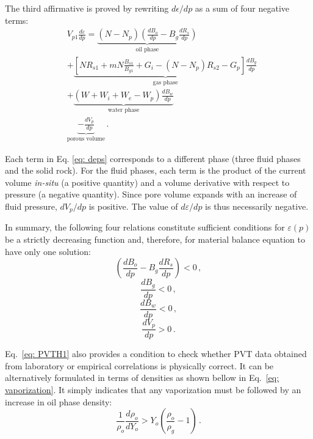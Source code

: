\documentclass[final,authoryear,5p,twocolumn,10pt]{elsarticle}
\begin{document}
The third affirmative is proved by rewriting $d\epsilon/dp$ as a sum of four negative terms:
\begin{equation}\label{eq: deps}
\begin{split}
&V_{p1}\frac{d\varepsilon}{dp}=\underbrace{\left(N-N_p\right) \left(\frac{dB_o}{dp} - B_g \frac{dR_s}{dp} \right)}_\text{oil phase}\\
&+\underbrace{\left[N R_{s1}+mN\frac{B_{o1}}{B_{g1}}+G_i-\left(N-N_p\right)R_{s2}-G_p\right] \frac{dB_g}{dp}}_\text{gas phase}\\
&+\underbrace{\left(W + W_i+W_e-W_p\right)\frac{dB_w}{dp}}_\text{water phase}\\
&\underbrace{-\frac{dV_p}{dp}}_\text{porous volume}\, .
\end{split}
\end{equation}

Each term in Eq. \eqref{eq: deps} corresponds to a different phase (three fluid phases and the solid rock). For the fluid phases, each term is the product of the current volume \textit{in-situ} (a positive quantity) and a volume derivative with respect to pressure (a negative quantity). Since pore volume expands with an increase of fluid pressure, $dV_p/dp$ is positive. The value of $d\varepsilon/dp$ is thus necessarily negative.

In summary, the following four relations constitute sufficient conditions for $\varepsilon(p)$ be a strictly decreasing function and, therefore, for material balance equation to have only one solution:
\begin{equation}\label{eq: PVTH1}
\left(\frac{dB_o}{dp} - B_g \frac{dR_s}{dp} \right) < 0 \, ,
\end{equation}
\begin{equation}\label{eq: PVTH2}
\frac{dB_g}{dp} < 0 \, ,
\end{equation}
\begin{equation}\label{eq: PVTH3}
\frac{dB_w}{dp} < 0 \, ,
\end{equation}
\begin{equation}\label{eq: PVTH4}
\frac{dV_p}{dp} > 0 \, .
\end{equation}

Eq.~\eqref{eq: PVTH1} also provides a condition to check whether PVT data obtained from laboratory or empirical correlations is physically correct. It can be alternatively formulated in terms of densities as shown bellow in Eq.~\eqref{eq: vaporization}. It simply indicates that any vaporization must be followed by an increase in oil phase density:
\begin{equation}\label{eq: vaporization}
\frac{1}{\rho_o}\frac{d\rho_o}{dY_o} > Y_o \left( \frac{\rho_o}{\rho_g} - 1 \right) \, .
\end{equation}
\end{document}
